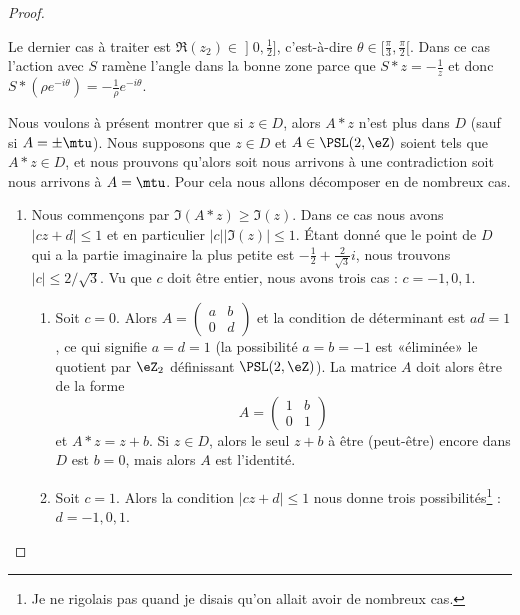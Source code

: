 \begin{proof}
\begin{subproof}
		Le dernier cas à traiter est \( \Re(z_2)\in\mathopen] 0 , \frac{ 1 }{2} \mathclose]\), c'est-à-dire \( \theta\in \mathopen[ \frac{ \pi }{ 3 } , \frac{ \pi }{2} [\). Dans ce cas l'action avec \( S\) ramène l'angle dans la bonne zone parce que \( S*z=-\frac{1}{ z }\) et donc \( S*(\rho e^{-i\theta})=-\frac{1}{ \rho } e^{-i\theta}\).

		\spitem[Unicité]

		Nous voulons à présent montrer que si \( z\in D\), alors \( A*z\) n'est plus dans \( D\) (sauf si \( A=\pm\mtu\)). Nous supposons que \( z\in D\) et \( A\in \PSL(2,\eZ)\) soient tels que \( A*z\in D\), et nous prouvons qu'alors soit nous arrivons à une contradiction soit nous arrivons à \( A=\mtu\). Pour cela nous allons décomposer en de nombreux cas.

		\begin{enumerate}
			\item
			      Nous commençons par \( \Im(A*z)\geq \Im(z)\). Dans ce cas nous avons \( | cz+d |\leq 1\) et en particulier \( | c | |\Im(z) |\leq 1\). Étant donné que le point de \( D\) qui a la partie imaginaire la plus petite est \( -\frac{ 1 }{2}+\frac{ 2 }{ \sqrt{3} }i\), nous trouvons \( | c |\leq 2/\sqrt{3}\). Vu que \( c\) doit être entier, nous avons trois cas : \( c=-1,0,1\).
			      \begin{enumerate}
				      \item
				            Soit \( c=0\). Alors \( A=\begin{pmatrix}
					            a & b \\
					            0 & d
				            \end{pmatrix}\) et la condition de déterminant est \( ad=1\), ce qui signifie \( a=d=1\) (la possibilité \( a=b=-1\) est «éliminée» le quotient par \( \eZ_2\) définissant \( \PSL(2,\eZ)\)). La matrice \( A\) doit alors être de la forme
				            \begin{equation}
					            A=\begin{pmatrix}
						            1 & b \\
						            0 & 1
					            \end{pmatrix}
				            \end{equation}
				            et \( A*z=z+b\). Si \( z\in D\), alors le seul \( z+b\) à être (peut-être) encore dans \( D\) est \( b=0\), mais alors \( A\) est l'identité.

				      \item
				            Soit \( c=1\). Alors la condition \( | cz+d |\leq 1\) nous donne trois possibilités\footnote{Je ne rigolais pas quand je disais qu'on allait avoir de nombreux cas.} : \( d=-1,0,1\).


\end{enumerate}
\end{enumerate}
\end{subproof}
\end{proof}
